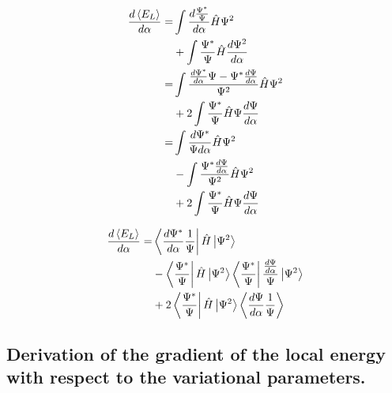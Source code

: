 \begin{equation*}
    \begin{split}
        \frac{d\expval{E_L}}{d\alpha} =& \int \frac{d\frac{\Psi^*}{\Psi}}{d\alpha}\hat{H}\Psi^2 \\
        &+\int \frac{\Psi^*}{\Psi}\hat{H}\frac{d\Psi^2}{d\alpha} \\
        =& \int \frac{\frac{d\Psi^*}{d\alpha}\Psi - \Psi^*\frac{d\Psi}{d\alpha}}{\Psi^2}\hat{H}\Psi^2  \\
        &+ 2\int \frac{\Psi^*}{\Psi}\hat{H}\Psi\frac{d\Psi}{d\alpha} \\
        =& \int \frac{d\Psi^*}{\Psi d\alpha}\hat{H}\Psi^2 \\
        &- \int \frac{\Psi^*\frac{d\Psi}{d\alpha}}{\Psi^2}\hat{H}\Psi^2 \\
        &+ 2\int \frac{\Psi^*}{\Psi}\hat{H}\Psi\frac{d\Psi}{d\alpha} \\
    \end{split}
\end{equation*}

\begin{equation*}
    \begin{split}
        \frac{d\expval{E_L}}{d\alpha} =& \bra{\frac{d\Psi^*}{d\alpha}\frac{1}{\Psi}}\hat{H}\ket{\Psi^2} \\
        &- \bra{\frac{\Psi^*}{\Psi}}\hat{H}\ket{\Psi^2}\bra{\frac{\Psi^*}{\Psi}}\frac{\frac{d\Psi}{d\alpha}}{\Psi}\ket{\Psi^2} \\
        &+ 2\bra{\frac{\Psi^*}{\Psi}}\hat{H}\ket{\Psi^2}\expval{\frac{d\Psi}{d\alpha}\frac{1}{\Psi}}
    \end{split}
\end{equation*}


\subsection{Derivation of the gradient of the local energy with respect to the variational parameters.}\label{sec:gradient_local_energy}

